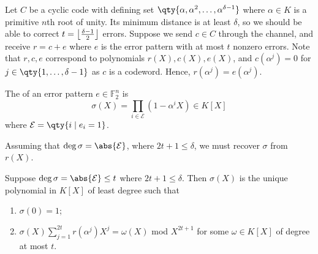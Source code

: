 Let $C$ be a cyclic code with defining set $\qty{\alpha, \alpha^2, \dots, \alpha^{\delta - 1}}$ where $\alpha \in K$ is a primitive $n$th root of unity.
Its minimum distance is at least $\delta$, so we should be able to correct $t = \floor*{\frac{\delta - 1}{2}}$ errors.
Suppose we send $c \in C$ through the channel, and receive $r = c + e$ where $e$ is the error pattern with at most $t$ nonzero errors.
Note that $r, c, e$ correspond to polynomials $r(X), c(X), e(X)$, and $c(\alpha^j) = 0$ for $j \in \qty{1, \dots, \delta - 1}$ as $c$ is a codeword.
Hence, $r(\alpha^j) = e(\alpha^j)$.
\begin{definition}
    The  of an error pattern $e \in \mathbb F_2^n$ is
    \[ \sigma(X) = \prod_{i \in \mathcal E} (1 - \alpha^i X) \in K[X] \]
    where $\mathcal E = \qty{i \mid e_i = 1}$.
\end{definition}
Assuming that $\deg \sigma = \abs{\mathcal E}$, where $2t + 1 \leq \delta$, we must recover $\sigma$ from $r(X)$.
\begin{theorem}
    Suppose $\deg \sigma = \abs{\mathcal E} \leq t$ where $2t + 1 \leq \delta$.
    Then $\sigma(X)$ is the unique polynomial in $K[X]$ of least degree such that
    \begin{enumerate}
        \item $\sigma(0) = 1$;
        \item $\sigma(X) \sum_{j=1}^{2t} r(\alpha^j) X^j = \omega(X)$ mod $X^{2t+1}$ for some $\omega \in K[X]$ of degree at most $t$.
    \end{enumerate}
\end{theorem}
